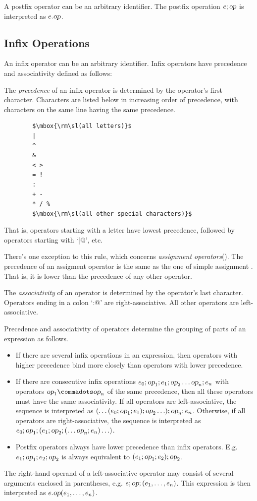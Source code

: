 A postfix operator can be an arbitrary identifier. The postfix
operation $e;\mbox{\sl op}$ is interpreted as $e.\mbox{\sl op}$. 

\subsection{Infix Operations}

An infix operator can be an arbitrary identifier. Infix operators have
precedence and associativity defined as follows:

The {\em precedence} of an infix operator is determined by the operator's first
character. Characters are listed below in increasing order of
precedence, with characters on the same line having the same precedence.
\begin{lstlisting}
        $\mbox{\rm\sl(all letters)}$
        |
        ^
        &
        < >
        = !
        :
        + -
        * / %
        $\mbox{\rm\sl(all other special characters)}$
\end{lstlisting}
That is, operators starting with a letter have lowest precedence,
followed by operators starting with `\lstinline@|@', etc.

There's one exception to this rule, which concerns
{\em assignment operators}().
The precedence of an assigment operator is the same as the one
of simple assignment \code{(=)}. That is, it is lower than the
precedence of any other operator. 

The {\em associativity} of an operator is determined by the operator's
last character.  Operators ending in a colon `\lstinline@:@' are
right-associative. All other operators are left-associative.

Precedence and associativity of operators determine the grouping of
parts of an expression as follows.
\begin{itemize}
\item If there are several infix operations in an
expression, then operators with higher precedence bind more closely
than operators with lower precedence.
\item If there are consecutive infix
operations $e_0; \mbox{\sl op}_1; e_1; \mbox{\sl op}_2 \ldots \mbox{\sl op}_n; e_n$ 
with operators $\op_1 \commadots \op_n$ of the same precedence, 
then all these operators must
have the same associativity. If all operators are left-associative,
the sequence is interpreted as
$(\ldots(e_0;\mbox{\sl op}_1;e_1);\mbox{\sl op}_2\ldots);\mbox{\sl op}_n;e_n$. 
Otherwise, if all operators are right-associative, the
sequence is interpreted as
$e_0;\mbox{\sl op}_1;(e_1;\mbox{\sl op}_2;(\ldots \mbox{\sl op}_n;e_n)\ldots)$.
\item
Postfix operators always have lower precedence than infix
operators. E.g.\ $e_1;\mbox{\sl op}_1;e_2;\mbox{\sl op}_2$ is always equivalent to
$(e_1;\mbox{\sl op}_1;e_2);\mbox{\sl op}_2$.
\end{itemize}
The right-hand operand of a left-associative operator may consist of
several arguments enclosed in parentheses, e.g. $e;\mbox{\sl op};(e_1,\ldots,e_n)$.
This expression is then interpreted as $e.\mbox{\sl op}(e_1,\ldots,e_n)$.

